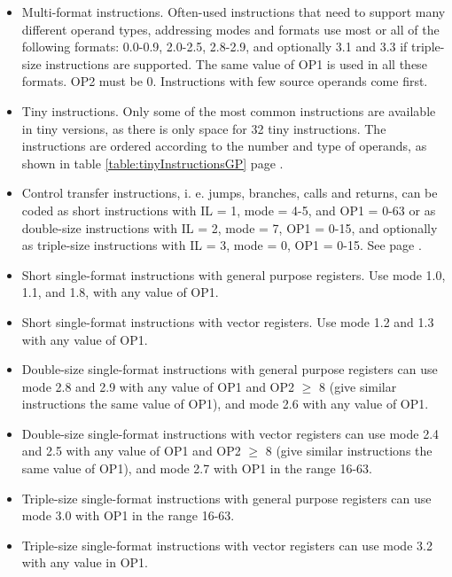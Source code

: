\documentclass[forwardcom.tex]{subfiles}
\begin{document}
\begin{itemize}
\item Multi-format instructions. Often-used instructions that need to support many different operand types, addressing modes and formats use most or all of the following formats: 0.0-0.9, 2.0-2.5, 2.8-2.9, and optionally 3.1 and 3.3 if triple-size instructions are supported. The same value of OP1 is used in all these formats. OP2 must be 0. Instructions with few source operands come first.

\item Tiny instructions. Only some of the most common instructions are available in tiny versions, as there is only space for 32 tiny instructions. The instructions are ordered according to the number and type of operands, as shown in table \ref{table:tinyInstructionsGP} page \pageref{table:tinyInstructionsGP}.

\item Control transfer instructions, i. e. jumps, branches, calls and returns, can be coded as short instructions with IL = 1, mode = 4-5, and OP1 = 0-63 or as double-size instructions with IL = 2, mode = 7, OP1 = 0-15, and optionally as triple-size instructions with IL = 3, mode = 0, OP1 = 0-15. See page \pageref{table:jumpInstructionFormats}.

\item Short single-format instructions with general purpose registers. Use mode 1.0, 1.1, and 1.8, with  any value of OP1.

\item Short single-format instructions with vector registers. Use mode 1.2 and 1.3
with any value of OP1.

\item Double-size single-format instructions with general purpose registers can use mode 2.8 and 2.9 with any value of OP1 and OP2 $\geq$ 8 (give similar instructions the same value of OP1), and mode 2.6 with any value of OP1.

\item Double-size single-format instructions with vector registers can use mode 2.4 and 2.5 with any value of OP1 and OP2 $\geq$ 8 (give similar instructions the same value of OP1), and mode 2.7 with OP1 in the range 16-63.

\item Triple-size single-format instructions with general purpose registers can use mode 3.0 with OP1 in the range 16-63.

\item Triple-size single-format instructions with vector registers can use mode 3.2 with any value in OP1.


\end{itemize}
\end{document}
